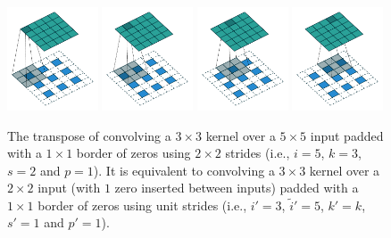 \begin{figure}[p]
    \centering
    \includegraphics[width=0.24\textwidth]{pdf/padding_strides_transposed_00.pdf}
    \includegraphics[width=0.24\textwidth]{pdf/padding_strides_transposed_01.pdf}
    \includegraphics[width=0.24\textwidth]{pdf/padding_strides_transposed_02.pdf}
    \includegraphics[width=0.24\textwidth]{pdf/padding_strides_transposed_03.pdf}
    \caption{\label{fig:padding_strides_transposed} The transpose of convolving
        a $3 \times 3$ kernel over a $5 \times 5$ input padded with a $1 \times
        1$ border of zeros using $2 \times 2$ strides (i.e., $i = 5$, $k = 3$,
        $s = 2$ and $p = 1$). It is equivalent to convolving a $3 \times 3$
        kernel over a $2 \times 2$ input (with $1$ zero inserted between
        inputs) padded with a $1 \times 1$ border of zeros using unit strides
        (i.e., $i' = 3$, $\tilde{i}' = 5$, $k' = k$, $s' = 1$ and $p' = 1$).}
\end{figure}

